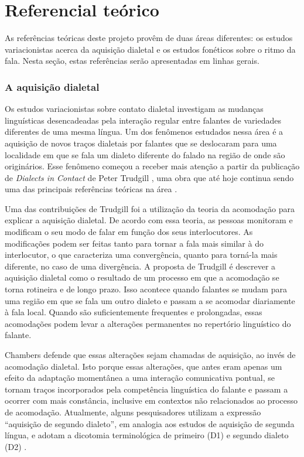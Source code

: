 \documentclass[a4paper, 12pt, article, oneside, brazil,leqno]{memoir}
\begin{document}
\chapter{Referencial teórico}

As referências teóricas deste projeto provêm de duas áreas diferentes: os estudos variacionistas acerca da aquisição dialetal e os estudos fonéticos sobre o ritmo da fala. Nesta seção, estas referências serão apresentadas em linhas gerais.

\subsection{A aquisição dialetal}

Os estudos variacionistas sobre contato dialetal investigam as mudanças linguísticas desencadeadas pela interação regular entre falantes de variedades diferentes de uma mesma língua. Um dos fenômenos estudados nessa área é a aquisição de novos traços dialetais por falantes que se deslocaram para uma localidade em que se fala um dialeto diferente do falado na região de onde são originários. Esse fenômeno começou a receber mais atenção a partir da publicação de \emph{Dialects in Contact} de Peter Trudgill \citeyear{trudgill1986}, uma obra que até hoje continua sendo uma das principais referências teóricas na área \cite{milroy2002}. 

Uma das contribuições de Trudgill \citeyear{trudgill1986} foi a utilização da teoria da acomodação \cite{giles1973} para explicar a aquisição dialetal. De acordo com essa teoria, as pessoas monitoram e modificam o seu modo de falar em função dos seus interlocutores. As modificações podem ser feitas tanto para tornar a fala mais similar à do interlocutor, o que caracteriza uma convergência, quanto para torná-la mais diferente, no caso de uma divergência. A proposta de Trudgill \citeyear{trudgill1986} é descrever a aquisição dialetal como o resultado de um processo em que a acomodação se torna rotineira e de longo prazo. Isso acontece quando falantes se mudam para uma região em que se fala um outro dialeto e passam a se acomodar diariamente à fala local. Quando são suficientemente frequentes e prolongadas, essas acomodações podem levar a alterações permanentes no repertório linguístico do falante.

Chambers \citeyear{chambers1992} defende que essas alterações sejam chamadas de aquisição, ao invés de acomodação dialetal. Isto porque essas alterações, que antes eram apenas um efeito da adaptação momentânea a uma interação comunicativa pontual, se tornam traços incorporados pela competência linguística do falante e passam a ocorrer com mais constância, inclusive em contextos não relacionados ao processo de acomodação. Atualmente, alguns pesquisadores utilizam a expressão \enquote{aquisição de segundo dialeto}, em analogia aos estudos de aquisição de segunda língua, e adotam a dicotomia terminológica de primeiro (D1) e segundo dialeto (D2) \cite{siegel2010}. 
\end{document}
